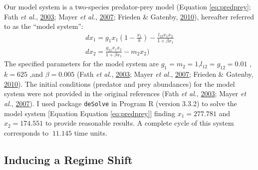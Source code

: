 \documentclass[12pt,twoside,openany]{reedthesis}
\begin{document}
Our model system is a two-species predator-prey model (Equation \eqref{eq:predprey}; Fath \emph{et al.}, \protect\hyperlink{ref-fath_regime_2003}{2003}; Mayer \emph{et al.}, \protect\hyperlink{ref-mayer_applications_2007}{2007}; Frieden \& Gatenby, \protect\hyperlink{ref-frieden_exploratory_2010}{2010}), hereafter referred to as the ``model system'':
\begin{equation} 
\begin{array}{rcr}
  dx_1 = g_{1}x_{1}(1-\frac{x_1}{k})- \frac{l_{12} x_{1} x_{2}}{1+\beta x_{1}} \\
  dx_2 = \frac{g_{21}x_1 x_2}{1+\beta x_1} - m_2 x_2)
  \end{array}
  \label{eq:predprey}
\end{equation}
The specified parameters for the model system are \(g_1=m_2=1\),\(l_{12}=g_{12}= 0.01\) ,\(k=625\) ,and \(\beta=0.005\) (Fath \emph{et al.}, \protect\hyperlink{ref-fath_regime_2003}{2003}; Mayer \emph{et al.}, \protect\hyperlink{ref-mayer_applications_2007}{2007}; Frieden \& Gatenby, \protect\hyperlink{ref-frieden_exploratory_2010}{2010}). The initial conditions (predator and prey abundances) for the model system were not provided in the original references (Fath \emph{et al.}, \protect\hyperlink{ref-fath_regime_2003}{2003}; Mayer \emph{et al.}, \protect\hyperlink{ref-mayer_applications_2007}{2007}). I used package \texttt{deSolve} in Program R (version 3.3.2) to solve the model system {[}Equation Equation \eqref{eq:predprey}{]} finding \(x_1=277.781\) and \(x_2=174.551\) to provide reasonable results. A complete cycle of this system corresponds to \(~11.145\) time units.

\hypertarget{inducing-a-regime-shift}{%
\subsection{Inducing a Regime Shift}\label{inducing-a-regime-shift}}
\end{document}
